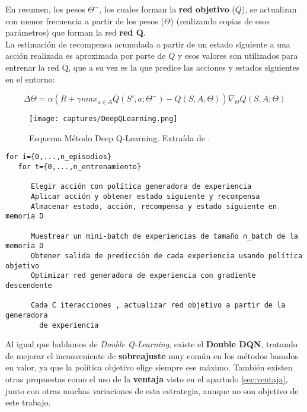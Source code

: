 \documentclass[11pt,fleqn]{book} %
\begin{document}
En resumen, los pesos $\Theta^-$, los cuales forman la \textbf{red objetivo} ($\overline{Q}$), se actualizan con menor frecuencia a partir de los pesos ($\Theta$) (realizando copias de esos parámetros) que forman la red \textbf{red Q}. \\
	
La estimación de recompensa acumulada a partir de un estado siguiente a una acción realizada es aproximada por parte de $\overline{Q}$ y esos valores son utilizados para entrenar la red Q, que a su vez es la que predice las acciones y estados siguientes en el entorno:

\begin{equation}
\Delta\Theta=\alpha(R+\gamma max_{a \in A} \overline{Q}(S',a;\Theta^-)-Q(S,A,\Theta))\nabla_\Theta Q(S,A;\Theta)
\end{equation}

\begin{figure}[H]
	\centering\texttt{[image: captures/DeepQLearning.png]}
	\caption{Esquema Método Deep Q-Learning. Extraída de \cite{book:barto} \cite{article:RLromero}.}
	\label{fig:deepqlearning} %
\end{figure}

\begin{verbatim}
for i={0,...,n_episodios}
   for t={0,...,n_entrenamiento}

      Elegir acción con política generadora de experiencia
      Aplicar acción y obtener estado siguiente y recompensa
      Almacenar estado, acción, recompensa y estado siguiente en memoria D

      Muestrear un mini-batch de experiencias de tamaño n_batch de la memoria D
      Obtener salida de predicción de cada experiencia usando política objetivo
      Optimizar red generadora de experiencia con gradiente descendente

      Cada C iteracciones , actualizar red objetivo a partir de la generadora
        de experiencia
\end{verbatim}

Al igual que hablamos de \textit{Double Q-Learning}, existe el \textbf{Double DQN}, tratando de mejorar el inconveniente de \textbf{sobreajuste} muy común en los métodos basados en valor, ya que la política objetivo elige siempre ese máximo. También existen otras propuestas como el uso de la \textbf{ventaja} visto en el apartado \ref{sec:ventaja}, junto con otras muchas variaciones de esta estrategia, aunque no son objetivo de este trabajo.
\end{document}
